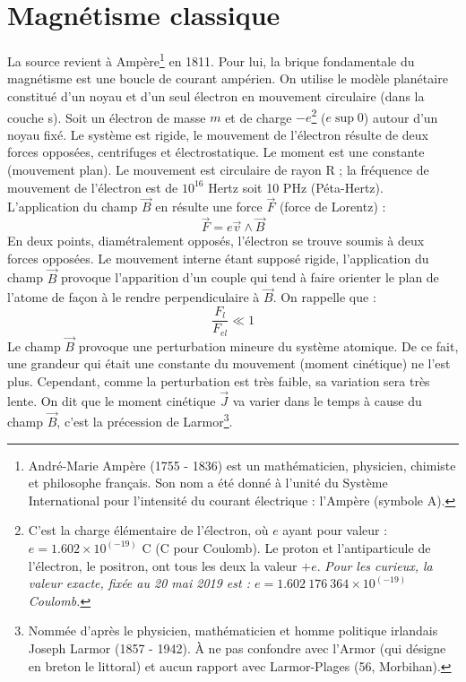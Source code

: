 \documentclass[12pt,a4paper,titlepage]{book}
\begin{document}
\section{Magnétisme classique}

La source revient à Ampère\footnote{\label{Ampère} André-Marie Ampère (1755 - 1836) est un mathématicien, physicien, chimiste et philosophe français. Son nom a été donné à l'unité du Système International pour l'intensité du courant électrique : l'Ampère (symbole A).} en 1811. Pour lui, la brique fondamentale du magnétisme est une boucle de courant ampérien. On utilise le modèle planétaire constitué d'un noyau et d'un seul électron en mouvement circulaire (dans la couche s). Soit un électron de masse $m$ et de charge $-e$\footnote{\label{élect} C'est la charge élémentaire de l'électron, où $e$ ayant pour valeur : $e = 1.602 \times 10^{(-19)}$ C (C pour Coulomb). Le proton et l'antiparticule de l'électron, le positron, ont tous les deux la valeur $+e$. \textit{Pour les curieux, la valeur exacte, fixée au 20 mai 2019 est : $e = 1.602~176~364 \times 10^{(-19)}$ Coulomb.}} ($e \sup 0$) autour d'un noyau fixé. Le système est rigide, le mouvement de l'électron résulte de deux forces opposées, centrifuges et électrostatique. Le moment est une constante (mouvement plan). Le mouvement est circulaire de rayon R ; la fréquence de mouvement de l'électron est de $10^{16}$ Hertz soit 10 PHz (Péta-Hertz). L'application du champ $\overrightarrow{B}$ en résulte une force $\overrightarrow{F}$ (force de Lorentz) :
\begin{equation*}
\overrightarrow{F} = e \overrightarrow{v} \wedge \overrightarrow{B}
\end{equation*}
En deux points, diamétralement opposés, l'électron se trouve soumis à deux forces opposées. Le mouvement interne étant supposé rigide, l'application du champ $\overrightarrow{B}$ provoque l'apparition d'un couple qui tend à faire orienter le plan de l'atome de façon à le rendre perpendiculaire à $\overrightarrow{B}$. On rappelle que :
\begin{equation*}
\frac{F_l}{F_{el}} \ll 1
\end{equation*}
Le champ $\overrightarrow{B}$ provoque une perturbation mineure du système atomique. De ce fait, une grandeur qui était une constante du mouvement (moment cinétique) ne l'est plus. Cependant, comme la perturbation est très faible, sa variation sera très lente. On dit que le moment cinétique $\overrightarrow{J}$ va varier dans le temps à cause du champ $\overrightarrow{B}$, c'est la précession de Larmor\footnote{\label{Armor} Nommée d'après le physicien, mathématicien et homme politique irlandais Joseph Larmor (1857 - 1942). À ne pas confondre avec l'Armor (qui désigne en breton le littoral) et aucun rapport avec Larmor-Plages (56, Morbihan).}.\\
\end{document}
